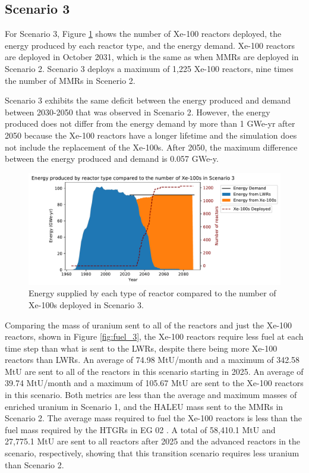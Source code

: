\subsection{Scenario 3}
For Scenario 3, Figure \ref{fig:energy_rx_3} shows the number of Xe-100 
reactors deployed, the energy produced by each reactor type, and the 
energy demand. Xe-100 reactors are deployed in October 2031, which is the 
same as when \glspl{MMR}
are deployed in Scenario 2. Scenario 3 deploys a maximum of 1,225 Xe-100 
reactors, nine times the number of \glspl{MMR} in Scenerio 2.

Scenario 3 exhibits the same deficit between the energy produced and 
demand between 2030-2050 that was observed in Scenario 2. However, the 
energy produced does not differ from the energy demand by more than 1 GWe-yr 
after 2050 because the Xe-100 reactors have a longer lifetime and the 
simulation does not include the replacement of the Xe-100s. After 2050, the 
maximum difference between the energy produced and demand is 0.057 GWe-y. 

\begin{figure}
    \centering 
    \includegraphics[width=\textwidth]{../figures/energy_scenario3.pdf}
    \caption{Energy supplied by each type of reactor compared to the number of 
    Xe-100s deployed in Scenario 3.}
    \label{fig:energy_rx_3}
\end{figure}

Comparing the mass of uranium sent to all of the reactors and just the Xe-100 
reactors, shown in Figure \ref{fig:fuel_3}, the Xe-100 reactors 
require less fuel at each time step than what is sent to the \glspl{LWR}, 
despite there being more Xe-100 reactors than \glspl{LWR}. An average of 
74.98 MtU/month and a maximum of 342.58 MtU are sent to all of the reactors 
in this scenario starting in 2025. An average of 39.74 
MtU/month and a maximum of 105.67 MtU are sent to the Xe-100 reactors in 
this scenario. Both metrics are less than the 
average and maximum masses of enriched uranium  
in Scenario 1, and the \gls{HALEU} mass sent to the \glspl{MMR} in 
Scenario 2. The average mass required to fuel the Xe-100 reactors is less 
than the fuel mass required by the \glspl{HTGR} in \gls{EG} 02 
\cite{wigeland_nuclear_2014}. A total of 58,410.1 MtU and 27,775.1 MtU are sent to 
all reactors after 2025 and the advanced reactors in the scenario, respectively, 
showing
that this transition scenario requires less uranium than Scenario 2. 

